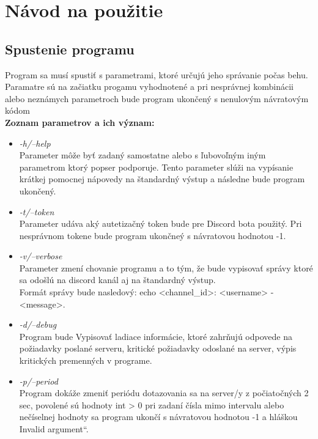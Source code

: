\documentclass[11pt,a4paper]{article}
\providecommand{\uv}[1]{\quotedblbase #1\textquotedblleft}
\begin{document}
\section{Návod na použitie}

	\subsection{Spustenie programu}

    Program sa musí spustiť s parametrami, ktoré určujú jeho správanie počas behu. Paramatre sú na začiatku progamu vyhodnotené a pri nesprávnej kombinácii alebo neznámych parametroch bude program ukončený s nenulovým návratovým kódom\\

	\textbf{Zoznam parametrov a ich význam:}
	\begin{itemize}

		\item \textit{-h/--help}\\[0.4em]
			Parameter môže byť zadaný samostatne alebo s ľubovoľným iným parametrom ktorý popser podporuje. Tento parameter slúži na vypísanie krátkej pomocnej nápovedy na štandardný výstup a následne bude program ukončený.

		\item \textit{-t/--token}\\[0.4em]
			Parameter udáva aký autetizačný token bude pre Discord bota použitý. Pri nesprávnom tokene bude program ukončneý s návratovou hodnotou -1.

		\item \textit{-v/--verbose}\\[0.4em]
			Parameter zmení chovanie programu a to tým, že bude vypisovať správy ktoré sa odošlú na discord kanál aj na štandardný výstup.\\
			Formát správy bude nasledový: echo <channel\_id>: <username> - <message>.
			
		\item \textit{-d/--debug}\\[0.4em]
			Program bude Vypisovať ladiace informácie, ktoré zahrňujú odpovede na požiadavky poslané serveru, kritické požiadavky odoslané na server, výpis kritických premenných v programe. 
			
        \item \textit{-p/--period}\\[0.4em]
            Program dokáže zmeniť periódu dotazovania sa na server/y z počiatočných 2 sec, povolené sú hodnoty int > 0 pri zadaní čísla mimo intervalu alebo nečíselnej hodnoty sa program ukončí s návratovou hodnotou -1 a hláškou \uv{Invalid argument}.
            
	\end{itemize}
	
\end{document}
